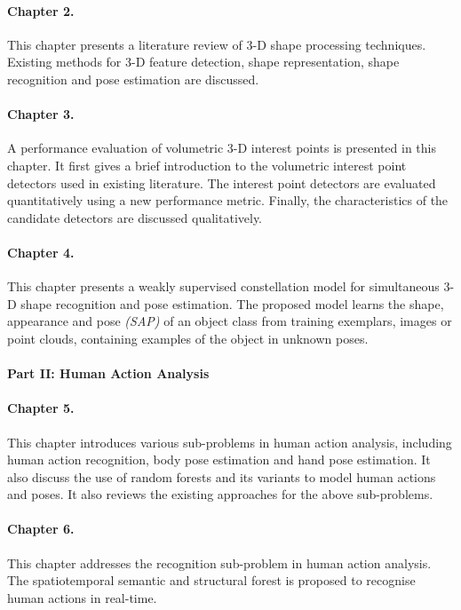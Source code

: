\paragraph{Chapter 2.} 
This chapter presents a literature review of 3-D shape processing techniques.  
Existing methods for 3-D feature detection, shape representation, shape recognition and pose estimation are discussed.  

\paragraph{Chapter 3.} 
A performance evaluation of volumetric 3-D interest points is presented in this chapter. 
It first gives a brief introduction to the volumetric interest point detectors used in existing literature.
The interest point detectors are evaluated quantitatively using a new performance metric.
Finally, the characteristics of the candidate detectors are discussed qualitatively. 

\paragraph{Chapter 4.}
This chapter presents a weakly supervised constellation model for simultaneous 3-D shape recognition and pose estimation. 
The proposed model learns the shape, appearance and pose \emph{(SAP)} of an object class from training exemplars, \eg images or point clouds, containing examples of the object in unknown poses.  

\paragraph{Part II: Human Action Analysis}

\paragraph{Chapter 5.} 
This chapter introduces various sub-problems in human action analysis, including human action recognition, body pose estimation and hand pose estimation. 
It also discuss the use of random forests and its variants to model human actions and poses.    
It also reviews the existing approaches for the above sub-problems. 

\paragraph{Chapter 6.} 
This chapter addresses the recognition sub-problem in human action analysis. The spatiotemporal semantic and structural forest is proposed to recognise human actions in real-time.    

